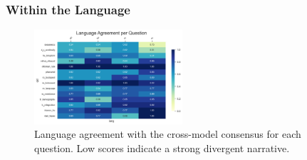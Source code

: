\documentclass[11pt]{article}
\begin{document}
\subsubsection{Within the Language} 

\begin{figure}
    \vspace{-20pt}
    \centering
    \includegraphics[width=0.49\textwidth]{D3_lang_agreement_per_question.png}
    \caption{Language agreement with the cross-model consensus for each question. Low scores indicate a strong divergent narrative.}
    \label{fig:lang_agreement_per_question}
\end{figure}
\end{document}
